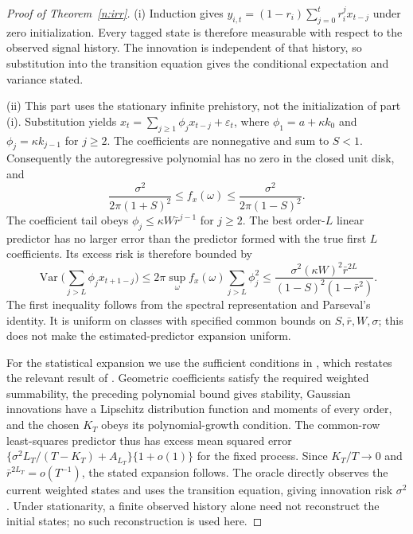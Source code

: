 \begin{proof}[Proof of Theorem~\ref{n:irr}]
(i) Induction gives $y_{i,t}=(1-r_i)\sum_{j=0}^t r_i^j x_{t-j}$ under zero initialization. Every tagged state is therefore measurable with respect to the observed signal history. The innovation is independent of that history, so substitution into the transition equation gives the conditional expectation and variance stated.

(ii) This part uses the stationary infinite prehistory, not the initialization of part (i). Substitution yields
$x_t=\sum_{j\ge1}\phi_jx_{t-j}+\varepsilon_t$,
where $\phi_1=a+\kappa k_0$ and $\phi_j=\kappa k_{j-1}$ for $j\ge2$. The coefficients are nonnegative and sum to $S<1$. Consequently the autoregressive polynomial has no zero in the closed unit disk, and
\[
\frac{\sigma^2}{2\pi(1+S)^2}\le f_x(\omega)
\le\frac{\sigma^2}{2\pi(1-S)^2}.
\]
The coefficient tail obeys $\phi_j\le\kappa W\bar r^{j-1}$ for $j\ge2$. The best order-$L$ linear predictor has no larger error than the predictor formed with the true first $L$ coefficients. Its excess risk is therefore bounded by
\[
\operatorname{Var}\Big(\sum_{j>L}\phi_jx_{t+1-j}\Big)
\le 2\pi\sup_\omega f_x(\omega)\sum_{j>L}\phi_j^2
\le\frac{\sigma^2(\kappa W)^2\bar r^{2L}}{(1-S)^2(1-\bar r^2)}.
\]
The first inequality follows from the spectral representation and Parseval's identity. It is uniform on classes with specified common bounds on $S,\bar r,W,\sigma$; this does not make the estimated-predictor expansion uniform.

For the statistical expansion we use the sufficient conditions in \citet[Section~2, Proposition~2]{ingwei2005}, which restates the relevant result of \citet{ingwei2003}. Geometric coefficients satisfy the required weighted summability, the preceding polynomial bound gives stability, Gaussian innovations have a Lipschitz distribution function and moments of every order, and the chosen $K_T$ obeys its polynomial-growth condition. The common-row least-squares predictor thus has excess mean squared error
$\{\sigma^2 L_T/(T-K_T)+A_{L_T}\}\{1+o(1)\}$
for the fixed process. Since $K_T/T\to0$ and $\bar r^{2L_T}=o(T^{-1})$, the stated expansion follows. The oracle directly observes the current weighted states and uses the transition equation, giving innovation risk $\sigma^2$. Under stationarity, a finite observed history alone need not reconstruct the initial states; no such reconstruction is used here.
\end{proof}

